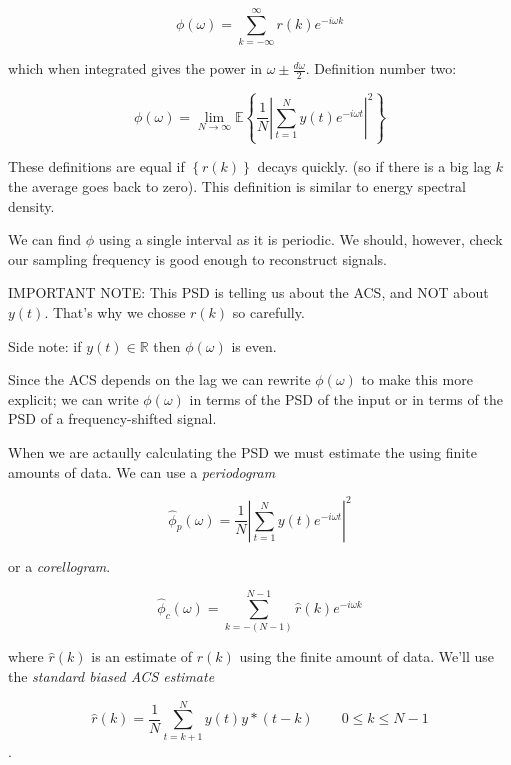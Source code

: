 \documentclass[11pt]{article}
\begin{document}
\begin{equation}
    \phi( \omega ) = \sum_{k = -\infty}^{\infty} r(k) e^{-i \omega k}
\end{equation}

which when integrated gives the power in $\omega \pm \frac{d \omega}{2}$.
Definition number two:

\begin{equation}
    \phi( \omega )= \lim_{N \rightarrow \infty} \mathbb{E} \left\{ \frac{1}{N} \left| \sum_{t
    = 1 }^N y(t) e^{-i \omega t} \right|^2 \right\}
\end{equation}

These definitions are equal if {\color{red} $\left\{ r(k) \right\}$ decays quickly}. (so if there is
a big lag $k$ the average goes back to zero). This definition is similar to energy spectral
density.

We can find $\phi$ using a single interval as it is periodic. We should, however, {\color{red}
check our sampling frequency is good enough to reconstruct signals}.

{\color{blue} IMPORTANT NOTE: This PSD is telling us about the ACS, and NOT about $y(t)$. That's
why we chosse $r(k)$ so carefully.}

Side note: if $y(t) \in \mathbb{R}$ then $\phi( \omega )$ is even.

Since the ACS depends on the lag we can rewrite $\phi( \omega )$ to make this more explicit; we
can write $\phi( \omega)$ in terms of the PSD of the input or in terms of the PSD of a
frequency-shifted signal.


When we are actaully calculating the PSD we must estimate the using finite amounts of data. We can
use a \emph{periodogram} 

\begin{equation}
    \hat{\phi}_p (\omega) = \frac{1}{N} \left| \sum_{t=1}^N y(t) e^{-i \omega t} \right|^2 
\end{equation}

or a \emph{corellogram}.

\begin{equation}
    \hat{\phi}_c (\omega) = \sum_{k = - (N-1)}^{N-1} \hat{r}(k) e^{-i \omega k}
    \end{equation}

    where $\hat{r}(k)$ is an estimate of $r(k)$ using the finite amount of data. We'll use the
    \emph{standard biased ACS estimate} 

    \begin{equation}
        \hat{r}(k) = \frac{1}{N} \sum_{t = k+1}^{N} y(t) y*(t-k) \qquad 0 \leq k \leq N-1
    \end{equation}.
\end{document}
